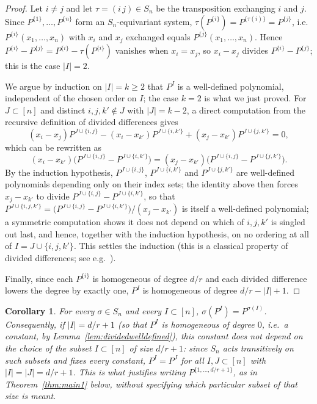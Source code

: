 \documentclass[12pt]{amsart}
\newtheorem{corollary}[theorem]{Corollary}
\theoremstyle{definition}
\begin{document}
\begin{proof}
Let $i \ne j$ and let $\tau = (i\, j) \in S_n$ be the transposition exchanging $i$ and $j$. Since $P^{\{1\}},\dots,P^{\{n\}}$ form an $S_n$-equivariant system, $\tau(P^{\{i\}}) = P^{\{\tau(i)\}} = P^{\{j\}}$, i.e.\ $P^{\{i\}}(x_1,\dots,x_n)$ with $x_i$ and $x_j$ exchanged equals $P^{\{j\}}(x_1,\dots,x_n)$. Hence $P^{\{i\}} - P^{\{j\}} = P^{\{i\}} - \tau(P^{\{i\}})$ vanishes when $x_i = x_j$, so $x_i - x_j$ divides $P^{\{i\}} - P^{\{j\}}$; this is the case $|I|=2$.

We argue by induction on $|I|=k \geqslant 2$ that $P^I$ is a well-defined polynomial, independent of the chosen order on $I$; the case $k=2$ is what we just proved. For $J \subset [n]$ and distinct $i,j,k' \notin J$ with $|J|=k-2$, a direct computation from the recursive definition of divided differences gives
\[
(x_i - x_j)P^{J\cup\{i,j\}} - (x_i - x_{k'})P^{J\cup\{i,k'\}} + (x_j - x_{k'})P^{J\cup\{j,k'\}} = 0,
\]
which can be rewritten as
\[
(x_i - x_{k'})\big(P^{J\cup\{i,j\}} - P^{J\cup\{i,k'\}}\big) = (x_j - x_{k'})\big(P^{J\cup\{i,j\}} - P^{J\cup\{j,k'\}}\big).
\]
By the induction hypothesis, $P^{J\cup\{i,j\}}$, $P^{J\cup\{i,k'\}}$ and $P^{J\cup\{j,k'\}}$ are well-defined polynomials depending only on their index sets; the identity above then forces $x_j - x_{k'}$ to divide $P^{J\cup\{i,j\}} - P^{J\cup\{i,k'\}}$, so that $P^{J\cup\{i,j,k'\}} = \big(P^{J\cup\{i,j\}} - P^{J\cup\{i,k'\}}\big)/(x_j - x_{k'})$ is itself a well-defined polynomial; a symmetric computation shows it does not depend on which of $i,j,k'$ is singled out last, and hence, together with the induction hypothesis, on no ordering at all of $I = J \cup \{i,j,k'\}$. This settles the induction (this is a classical property of divided differences; see e.g.\ \citep{Jouanolou1991}).

Finally, since each $P^{\{i\}}$ is homogeneous of degree $d/r$ and each divided difference lowers the degree by exactly one, $P^I$ is homogeneous of degree $d/r - |I| + 1$.
\end{proof}

\begin{corollary}
\label{cor:transitive}
For every $\sigma \in S_n$ and every $I \subset [n]$, $\sigma(P^I) = P^{\sigma(I)}$. Consequently, if $|I| = d/r + 1$ (so that $P^I$ is homogeneous of degree $0$, i.e.\ a constant, by Lemma~\ref{lem:dividedwelldefined}), this constant does not depend on the choice of the subset $I \subset [n]$ of size $d/r+1$: since $S_n$ acts transitively on such subsets and fixes every constant, $P^I = P^J$ for all $I, J \subset [n]$ with $|I|=|J|=d/r+1$. This is what justifies writing $P^{\{1,\dots,d/r+1\}}$, as in Theorem~\ref{thm:main1} below, without specifying which particular subset of that size is meant.
\end{corollary}
\end{document}
